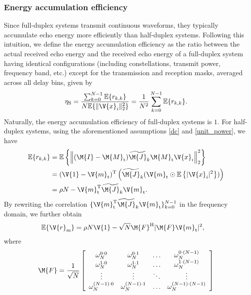 \documentclass[journal,a4paper,10pt, romanappendices]{IEEEtran}
\begin{document}
\subsubsection{Energy accumulation efficiency}
Since full-duplex systems transmit continuous waveforms, they typically accumulate echo energy more efficiently than half-duplex systems. Following this intuition, we define the energy accumulation efficiency as the ratio between the actual received echo energy and the received echo energy of a full-duplex system having identical configurations (including constellations, transmit power, frequency band, etc.) except for the transmission and reception masks, averaged across all delay bins, given by
\begin{equation}
\eta_{\rm S} = \frac{\sum_{k=0}^{N-1}\mathbb{E}\{r_{k,k}\}}{N \mathbb{E}\{\|\V{x}_i\|_2^2\}}=\frac{1}{N^2}\sum_{k=0}^{N-1}\mathbb{E}\{r_{k,k}\}.
\end{equation}
Naturally, the energy accumulation efficiency of full-duplex systems is $1$. For half-duplex systems, using the aforementioned assumptions \eqref{dc} and \eqref{unit_power}, we have
\begin{align}\label{expected_mainlobe}
\mathbb{E}\{r_{k,k}\}&=\mathbb{E}\left\{\left\|(\M{I}-\M{M}_{\rm t})\widetilde{\M{J}}_k\M{M}_{\rm t}\V{x}_i\right\|_2^2\right\} \nonumber\\
&= (\V{1}-\V{m}_{\rm t})^{\rm T}\left(\widetilde{\M{J}}_k(\V{m}_{\rm t}\odot \mathbb{E}\left\{|\V{x}_i|^2\right\})\right)\nonumber\\
&=\rho N - \V{m}_{\rm t}^{\rm T}\widetilde{\M{J}}_k\V{m}_{\rm t}.
\end{align}
By rewriting the correlation $\{\V{m}_{\rm t}^{\rm T}\widetilde{\M{J}}_k\V{m}_{\rm t}\}_{k=0}^{N-1}$ in the frequency domain, we further obtain
\begin{align}
\mathbb{E}\{\V{r}_{\rm m}\} &= \rho N\V{1} - \sqrt{N}\M{F}^{\rm H}|\M{F}\V{m}_{\rm t}|^2,
\end{align}
where
$$
\M{F}=\frac{1}{\sqrt{N}}\left[ {\begin{array}{*{20}{c}}
\omega_N^{0\cdot 0} & \omega_N^{0\cdot 1} & \dotsc & \omega_N^{0\cdot (N-1)}\\
\omega_N^{1\cdot 0} & \omega_N^{1\cdot 1} & \dotsc & \omega_N^{1\cdot (N-1)}\\
\vdots & \vdots & \ddots & \vdots \\
\omega_N^{(N-1)\cdot 0} & \omega_N^{(N-1)\cdot 1} & \dotsc & \omega_N^{(N-1)\cdot (N-1)}
\end{array}}\right]
$$
\end{document}
